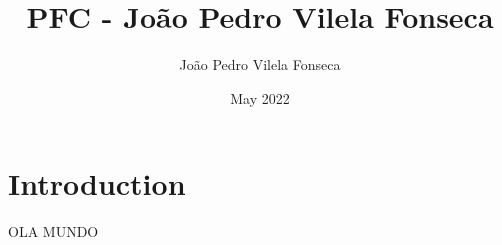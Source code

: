 \documentclass{article}
\title{PFC - João Pedro Vilela Fonseca}
\author{João Pedro Vilela Fonseca}
\date{May 2022}
\begin{document}
\maketitle

\section{Introduction}

OLA MUNDO
\end{document}
